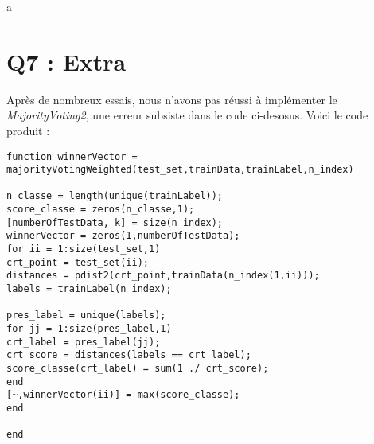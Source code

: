 a \documentclass[a4paper,11pt]{report}
\begin{document}
\section*{Q7 : Extra}

Après de nombreux essais, nous n'avons pas réussi à implémenter le \textit{MajorityVoting2}, une erreur subsiste dans le code 
ci-desosus. Voici le code produit :
\begin{lstlisting}
function winnerVector = majorityVotingWeighted(test_set,trainData,trainLabel,n_index)

n_classe = length(unique(trainLabel));
score_classe = zeros(n_classe,1);
[numberOfTestData, k] = size(n_index);
winnerVector = zeros(1,numberOfTestData);
for ii = 1:size(test_set,1)
crt_point = test_set(ii);    
distances = pdist2(crt_point,trainData(n_index(1,ii)));
labels = trainLabel(n_index);

pres_label = unique(labels);
for jj = 1:size(pres_label,1)
crt_label = pres_label(jj);
crt_score = distances(labels == crt_label);
score_classe(crt_label) = sum(1 ./ crt_score);
end
[~,winnerVector(ii)] = max(score_classe);
end

end
\end{lstlisting}
\end{document}
